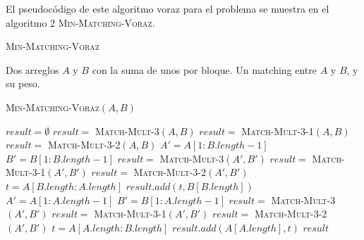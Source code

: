 \documentclass[conference]{IEEEtran}
\begin{document}
\begin{center}
\end{center}

El pseudocódigo de este algoritmo voraz para el problema se muestra en el algoritmo 2 \textsc{Min-Matching-Voraz}.

\begin{algorithm}
\caption{\textsc{Min-Matching-Voraz}}
\scriptsize
\begin{algorithmic}
\REQUIRE Dos arreglos $A$ y $B$ con la suma de unos por bloque.
\ENSURE Un matching entre $A$ y $B$, y su peso.
\begin{flushleft}
\textsc{Min-Matching-Voraz}$(A,B)$
\end{flushleft}
    \STATE $result=\emptyset$
            \STATE $result=$ \textsc{Match-Mult-3}$(A,B)$
            \STATE $result=$ \textsc{Match-Mult-3-1}$(A,B)$
        \ELSE
            \STATE $result=$ \textsc{Match-Mult-3-2}$(A,B)$
        \ENDIF
    \ELSE
            \STATE $A'=A[1:B.length-1]$
            \STATE $B'=B[1:B.length-1]$
                \STATE $result=$ \textsc{Match-Mult-3}$(A',B')$
                \STATE $result=$ \textsc{Match-Mult-3-1}$(A',B')$
            \ELSE
                \STATE $result=$ \textsc{Match-Mult-3-2}$(A',B')$
            \ENDIF
            \STATE $t=A[B.length:A.length]$
            \STATE $result.add(t,B[B.length])$
        \ELSE
            \STATE $A'=A[1:A.length-1]$
            \STATE $B'=B[1:A.length-1]$
                \STATE $result=$ \textsc{Match-Mult-3}$(A',B')$
                \STATE $result=$ \textsc{Match-Mult-3-1}$(A',B')$
            \ELSE
                \STATE $result=$ \textsc{Match-Mult-3-2}$(A',B')$
            \ENDIF
            \STATE $t=A[A.length:B.length]$
            \STATE $result.add(A[A.length],t)$
        \ENDIF
    \ENDIF
    \RETURN $result$
\end{algorithmic}
\label{alg:min-matching-voraz}
\end{algorithm}
\end{document}
